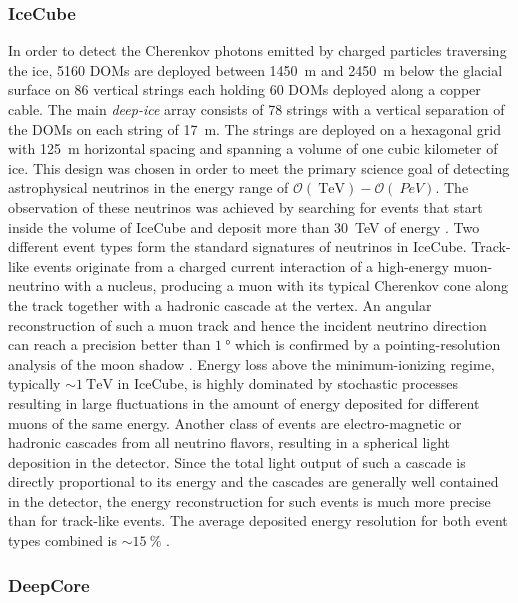 \subsubsection{IceCube}
In order to detect the Cherenkov photons emitted by charged particles traversing the ice, \num{5160} DOMs are deployed between \SI{1450}{\meter} and \SI{2450}
{\meter} below the glacial surface on \num{86} vertical strings each holding \num{60} DOMs deployed along a copper cable. The main \textit{deep-ice} 
array consists of \num{78} strings with a vertical separation of the DOMs on each string of \SI{17}{\meter}. The strings are deployed on a hexagonal grid with
\SI{125}{\meter} horizontal spacing and spanning a volume of one cubic kilometer of ice. 
This design was chosen in order to meet the primary science goal of detecting astrophysical neutrinos in the energy range of 
$\mathcal{O}(\SI{}{\tera\electronvolt}) - \mathcal{O}(\SI{}{PeV})$. The observation of these neutrinos was achieved by searching
for events that start inside the volume of IceCube and deposit more than \SI{30}{\tera\electronvolt} of energy \cite{IC3:evidence}. 
Two different event types form the standard signatures of neutrinos in IceCube.
Track-like events originate from a charged current interaction of a
high-energy muon-neutrino with a nucleus, producing a muon with
its typical Cherenkov cone along the track together with a hadronic cascade at the vertex.
An angular reconstruction of such a muon track and hence the incident neutrino direction
can reach a precision better than $ \SI{1}{\degree}$ which is confirmed by a pointing-resolution analysis
of the moon shadow \cite{IC3:moon}. Energy loss above the minimum-ionizing regime, typically $ \sim \SI{1}{\tera\electronvolt}$ in IceCube, is highly
dominated by stochastic processes resulting in large fluctuations in the amount of energy deposited for
different muons of the same energy. Another class of events are electro-magnetic or hadronic cascades from all
neutrino flavors, resulting in a spherical light deposition in the detector.
Since the total light output of such a cascade is directly proportional to its energy and the
cascades are generally well contained in the detector, the energy reconstruction for such
events is much more precise than for track-like events. The average deposited energy
resolution for both event types combined is $ \sim \SI{15}{\%}$ \cite{IC3:ereco}.


\subsubsection{DeepCore}

